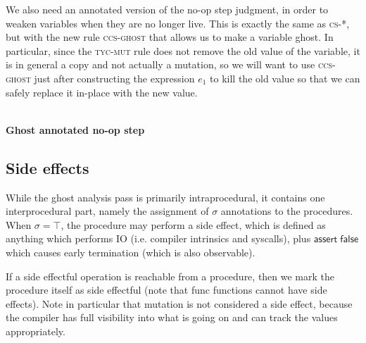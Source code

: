 \documentclass[acmsmall,nonacm]{acmart}
\newcommand{\proves}{\vdash}
\newcommand{\makes}{\dashv}
\newcommand{\constep}{\proves\cdot\makes}
\newcommand{\judgment}[2][]{\noindent\\\textbf{#1}\hspace{\stretch{1}}\fbox{$#2$}\nopagebreak}
\newcommand*{\axiom}[2][]{\infer[#1]{}{#2}}
\begin{document}
We also need an annotated version of the no-op step judgment, in order to weaken variables when they are no longer live. This is exactly the same as \textsc{cs-*}, but with the new rule \textsc{ccs-ghost} that allows us to make a variable ghost. In particular, since the \textsc{tyc-mut} rule does not remove the old value of the variable, it is in general a copy and not actually a mutation, so we will want to use \textsc{ccs-ghost} just after constructing the expression $e_1$ to kill the old value so that we can safely replace it in-place with the new value.

\judgment[Ghost annotated no-op step]{\Gamma;\delta \constep\delta'}

\subsection{Side effects}\label{sec:sideeffect}

While the ghost analysis pass is primarily intraprocedural, it contains one interprocedural part, namely the assignment of $\sigma$ annotations to the procedures. When $\sigma=\top$, the procedure may perform a side effect, which is defined as anything which performs IO (i.e. compiler intrinsics and syscalls), plus $\mathsf{assert}\;\mathsf{false}$ which causes early termination (which is also observable).

If a side effectful operation is reachable from a procedure, then we mark the procedure itself as side effectful (note that \textsf{func} functions cannot have side effects). Note in particular that mutation is not considered a side effect, because the compiler has full visibility into what is going on and can track the values appropriately.
\end{document}
